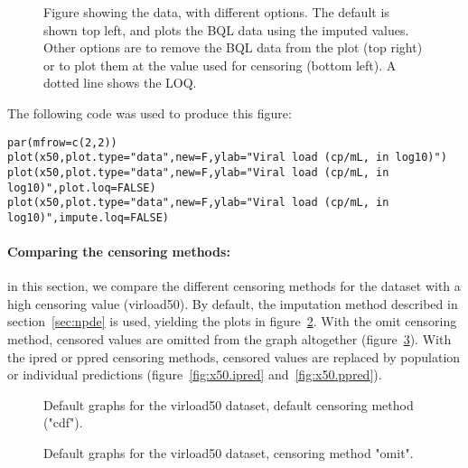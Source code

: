 \begin{figure}[!h]
\par\kern -0.3cm
\begin{center}
\end{center}
\caption{Figure showing the data, with different options. The default is shown top left, and plots the BQL data using the imputed values. Other options are to remove the BQL data from the plot (top right) or to plot them at the value used for censoring (bottom left). A dotted line shows the LOQ.}\label{fig:x50.data}
\end{figure}

The following code was used to produce this figure:
\begin{verbatim}
par(mfrow=c(2,2))
plot(x50,plot.type="data",new=F,ylab="Viral load (cp/mL, in log10)")
plot(x50,plot.type="data",new=F,ylab="Viral load (cp/mL, in log10)",plot.loq=FALSE)
plot(x50,plot.type="data",new=F,ylab="Viral load (cp/mL, in log10)",impute.loq=FALSE)
\end{verbatim} 

\paragraph{Comparing the censoring methods:} in this section, we compare the different censoring methods for the dataset with a high censoring value (virload50). By default, the imputation method described in section~\ref{sec:npde} is used, yielding the plots in figure~\ref{fig:x50.cdf}. With the {\sf omit} censoring method, censored values are omitted from the graph altogether (figure~\ref{fig:x50.omit}). With the {\sf ipred} or {\sf ppred} censoring methods, censored values are replaced by population or individual predictions (figure~\ref{fig:x50.ipred} and~\ref{fig:x50.ppred}).

\begin{figure}[!h]
\par\kern -0.3cm
\begin{center}
\end{center}
\par\kern -0.3cm
\caption{Default graphs for the virload50 dataset, default censoring method ({\sf "cdf"}).}\label{fig:x50.cdf}
\end{figure}

\begin{figure}[!h]
\par\kern -0.5cm
\begin{center}
\end{center}
\par\kern -0.5cm
\caption{Default graphs for the virload50 dataset, censoring method {\sf "omit"}.}\label{fig:x50.omit}
\end{figure}

